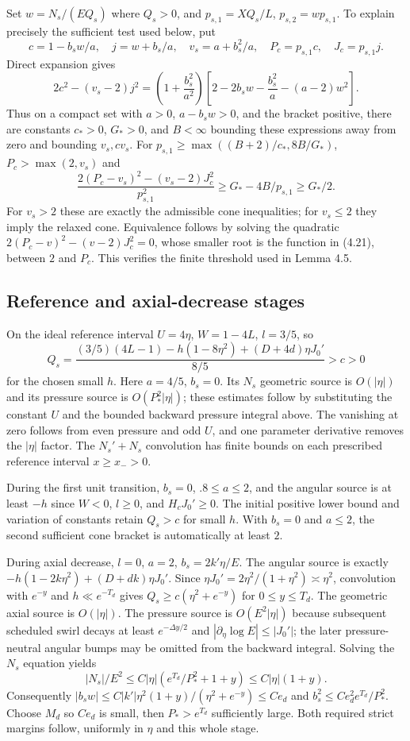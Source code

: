 \documentclass[10pt,a4paper]{article}
\begin{document}
Set $w=N_s/(EQ_s)$ where $Q_s>0$, and $p_{s,1}=XQ_s/L$,
$p_{s,2}=wp_{s,1}$. To explain precisely the sufficient test used below, put
\[
c=1-b_sw/a,\quad j=w+b_s/a,\quad v_s=a+b_s^2/a,
\quad P_c=p_{s,1}c,\quad J_c=p_{s,1}j.
\]
Direct expansion gives
\[
2c^2-(v_s-2)j^2
=\left(1+\frac{b_s^2}{a^2}\right)
\left[2-2b_sw-\frac{b_s^2}{a}-(a-2)w^2\right].
\]
Thus on a compact set with $a>0$, $a-b_sw>0$, and the bracket positive,
there are constants $c_*>0$, $G_*>0$, and $B<\infty$ bounding these
expressions away from zero and bounding $v_s,cv_s$. For
$p_{s,1}\ge\max((B+2)/c_*,8B/G_*)$,
$P_c>\max(2,v_s)$ and
\[
\frac{2(P_c-v_s)^2-(v_s-2)J_c^2}{p_{s,1}^2}
\ge G_*-4B/p_{s,1}\ge G_*/2.
\]
For $v_s>2$ these are exactly the admissible cone inequalities; for $v_s\le2$
they imply the relaxed cone. Equivalence follows by solving the quadratic
$2(P_c-v)^2-(v-2)J_c^2=0$, whose smaller root is the function in (4.21),
between $2$ and $P_c$. This verifies the finite threshold used in Lemma 4.5.

\subsection{Reference and axial-decrease stages}
On the ideal reference interval $U=4\eta$, $W=1-4L$, $l=3/5$, so
\[
Q_s=\frac{(3/5)(4L-1)-h(1-8\eta^2)+(D+4d)\eta J_0'}{8/5}>c>0
\]
for the chosen small $h$. Here $a=4/5$, $b_s=0$. Its $N_s$ geometric
source is $O(|\eta|)$ and its pressure source is $O(P_*^2|\eta|)$;
these estimates follow by substituting the constant $U$ and the bounded
backward pressure integral above. The vanishing at zero follows from even
pressure and odd $U$, and one parameter derivative removes the $|\eta|$
factor. The $N_s'+N_s$ convolution has finite bounds on each prescribed
reference interval $x\ge x_->0$.

During the first unit transition, $b_s=0$, $.8\le a\le2$, and
the angular source is at least $-h$ since $W<0$, $l\ge0$, and
$H_cJ_0'\ge0$. The initial positive lower bound and variation of constants
retain $Q_s>c$ for small $h$. With $b_s=0$ and $a\le2$, the second sufficient
cone bracket is automatically at least $2$.

During axial decrease, $l=0$, $a=2$, $b_s=2k'\eta/E$. The angular
source is exactly
$-h(1-2k\eta^2)+(D+dk)\eta J_0'$.
Since $\eta J_0'=2\eta^2/(1+\eta^2)\asymp\eta^2$, convolution with
$e^{-y}$ and $h\ll e^{-T_d}$ gives
$Q_s\ge c(\eta^2+e^{-y})$ for $0\le y\le T_d$.
The geometric axial source is $O(|\eta|)$. The pressure source is
$O(E^2|\eta|)$ because subsequent scheduled swirl decays at least
$e^{-\Delta y/2}$ and $|\partial_\eta\log E|\le |J_0'|$; the later
pressure-neutral angular bumps may be omitted from the backward integral.
Solving the $N_s$ equation yields
\[
|N_s|/E^2\le C|\eta|(e^{T_d}/P_*^2+1+y)
\le C|\eta|(1+y).
\]
Consequently
$|b_sw|\le C|k'|\eta^2(1+y)/(\eta^2+e^{-y})\le Ce_d$ and
$b_s^2\le Ce_d^2e^{T_d}/P_*^2$.
Choose $M_d$ so $Ce_d$ is small, then $P_*>e^{T_d}$ sufficiently large.
Both required strict margins follow, uniformly in $\eta$ and this whole stage.
\end{document}
